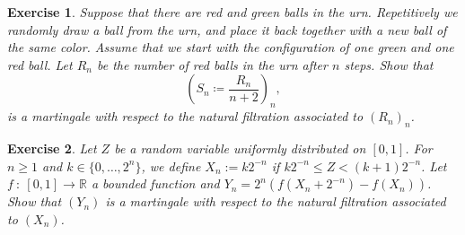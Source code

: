 \documentclass[12pt]{amsart}
\newtheorem{exo}{Exercise}
\numberwithin{equation}{section}
\newcommand{\R}{\mathbb R}
\renewcommand{\1}{\mathbf 1}
\begin{document}
\begin{exo}
    Suppose that there are red and green balls in the urn. Repetitively we randomly draw a ball from the urn, and place it back together with a new ball of the same color. Assume that we start with the configuration of one green and one red ball. Let $R_n$ be the number of red balls in the urn after $n$ steps. Show that
    $$\left( S_n \coloneqq \dfrac{R_n}{n+2}\right)_n,$$
    is a martingale with respect to the natural filtration associated to $(R_n)_n$.
\end{exo}


\begin{exo}
    Let $Z$ be a random variable uniformly distributed on $[0,1]$. For $n\geq 1$ and $k\in \{0,\dots,2^n\}$, we define $X_n:= k2^{-n}$ if $k2^{-n}\leq Z < (k+1)2^{-n}$. Let $f~:~[0,1]\to\R$ a bounded function and $Y_n=2^n(f(X_n+2^{-n})-f(X_n))$. Show that $(Y_n)$ is a martingale with respect to the natural filtration associated to $(X_n)$. 
\end{exo}
\end{document}
